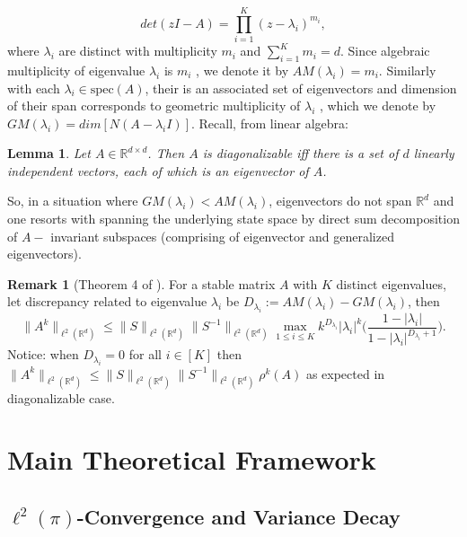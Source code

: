 \documentclass[preprint]{imsart}
\theoremstyle{plain}
\newtheorem{lemma}[theorem]{Lemma}
\theoremstyle{definition}
\newtheorem{remark}{Remark}
\begin{document}
\begin{equation}
    \label{eq:detcharpoly} det(zI-A)= \prod_{i=1}^{K} (z-\lambda_{i})^{m_i},
\end{equation}
where $\lambda_{i}$ are distinct with multiplicity $m_{i}$ and  $\sum_{i=1}^{K} m_i=d$. Since algebraic multiplicity of eigenvalue $\lambda_{i}$ is $m_{i}$ , we denote it by $AM(\lambda_{i})=m_{i}$. Similarly with each $\lambda_{i} \in \mathrm{spec}(A)$, their is an associated set of eigenvectors and dimension of their span corresponds to geometric multiplicity of $\lambda_{i}$ , which we denote by $GM(\lambda_{i})=dim[N(A-\lambda_{i}I)]$. Recall, from linear algebra:
\begin{lemma}
    Let $A \in \mathbb{R}^{d \times d}$. Then $A$ is diagonalizable iff there is a set of $d$ linearly independent vectors, each of which is an eigenvector of $A$. 
\end{lemma}
So, in a situation where $GM(\lambda_{i}) <AM(\lambda_{i}) $, eigenvectors do not span $\mathbb{R}^d$ and one resorts with spanning the underlying state space by direct sum decomposition of $A-$ invariant subspaces (comprising of eigenvector and generalized eigenvectors). 
\begin{remark}[Theorem 4 of \cite{naeem2023spectral}]
    \label{rmk:1stquantdecay}
    For a stable matrix $A$ with $K$ distinct eigenvalues, let discrepancy related to eigenvalue $\lambda_{i}$ be $D_{\lambda_{i}}:= AM(\lambda_{i})-GM(\lambda_{i})$, then 
    \begin{equation}
        \label{eq:qnthdl} \|A^{k}\|_{\ell^{2}(\mathbb{R}^{d})} \leq \|S\|_{\ell^{2}(\mathbb{R}^{d})}\|S^{-1}\|_{\ell^{2}(\mathbb{R}^{d})} \max_{1 \leq i \leq K}  k^{D_{\lambda_{i}}} |\lambda_{i}|^{k} \bigg( \frac{1-|\lambda_{i}|}{1-|\lambda_{i}|^{D_{\lambda_{i}}+1}}\bigg).
    \end{equation}
    Notice: when $D_{\lambda_{i}}=0$ for all $i \in [K]$ then $\|A^{k}\|_{\ell^{2}(\mathbb{R}^{d})} \leq \|S\|_{\ell^{2}(\mathbb{R}^{d})}\|S^{-1}\|_{\ell^{2}(\mathbb{R}^{d})}\rho^{k}(A)$ as expected in diagonalizable case. 
\end{remark}

\section{Main Theoretical Framework}
\label{sec:main_theory_fwk}
\subsection{$\ell^2(\pi)$-Convergence and Variance Decay}
\end{document}
